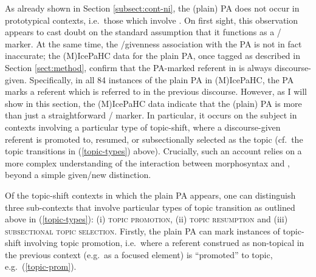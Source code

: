 \documentclass[output=paper,colorlinks,citecolor=brown]{langscibook}
\begin{document}
As already shown in Section \ref{subsect:cont-ni}, the (plain) PA does not occur in prototypical  contexts, i.e.~those which involve . On first sight, this observation appears to cast doubt on the standard assumption that it functions as a / marker. At the same time, the /givenness association with the PA is not in fact inaccurate; the (M)IcePaHC data for the plain PA, once tagged as described in Section \ref{sect:method}, confirm that the PA-marked referent in  is always discourse-given. Specifically, in all 84 instances of the plain PA in (M)IcePaHC, the PA marks a referent which is referred to in the previous discourse. However, as I will show in this section, the (M)IcePaHC data indicate that the (plain) PA is more than just a straightforward / marker. In particular, it occurs on the subject in contexts involving a particular type of topic-shift, where a discourse-given referent is promoted to, resumed, or subsectionally selected as the topic (cf.~the topic transitions in (\ref{topic-types}) above). Crucially, such an account relies on a more complex understanding of the interaction between  morphosyntax and , beyond a simple given/new distinction.
 

Of the topic-shift contexts in which the plain PA appears, one can distinguish three sub-contexts that involve particular types of topic transition as outlined above in (\ref{topic-types}): (i) \textsc{topic promotion}, (ii) \textsc{topic resumption} and (iii) \textsc{subsectional topic selection}. Firstly, the plain PA can mark instances of topic-shift involving topic promotion, i.e.~where a referent construed as non-topical in the previous context (e.g.~as a focused element) is ``promoted'' to topic, e.g.~(\ref{topic-prom}).
\end{document}
